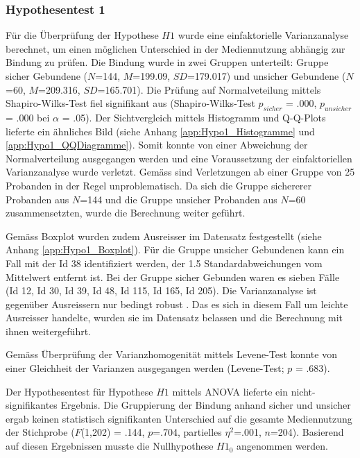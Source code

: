 \subsubsection{Hypothesentest 1}\label{sec:Hypothesentest1}
Für die Überprüfung der Hypothese $H1$ wurde eine einfaktorielle Varianzanalyse berechnet, um einen möglichen Unterschied in der Mediennutzung abhängig zur Bindung zu prüfen. Die Bindung wurde in zwei Gruppen unterteilt: Gruppe sicher Gebundene ($N$=144, $M$=199.09, $SD$=179.017) und unsicher Gebundene ($N$=60, $M$=209.316, $SD$=165.701). Die Prüfung auf Normalveteilung mittels Shapiro-Wilks-Test \cite{Shapiro1965} fiel signifikant aus (Shapiro-Wilks-Test $p_{sicher}$ = .000, $p_{unsicher}$ = .000 bei $\alpha$ = .05). Der Sichtvergleich mittels Histogramm und Q-Q-Plots lieferte ein ähnliches Bild (siehe Anhang \ref{app:Hypo1_Histogramme} und \ref{app:Hypo1_QQDiagramme}). Somit konnte von einer Abweichung der Normalverteilung ausgegangen werden \cite{Hemmerich2018} und eine Voraussetzung der einfaktoriellen Varianzanalyse wurde verletzt. Gemäss  sind Verletzungen ab einer Gruppe von 25 Probanden in der Regel unproblematisch. Da sich die Gruppe sichererer Probanden aus $N$=144 und die Gruppe unsicher Probanden aus $N$=60 zusammensetzten, wurde die Berechnung weiter geführt.

Gemäss Boxplot wurden zudem Ausreisser im Datensatz festgestellt (siehe Anhang \ref{app:Hypo1_Boxplot}). Für die Gruppe unsicher Gebundenen kann ein Fall mit der Id 38 identifiziert werden, der 1.5 Standardabweichungen vom Mittelwert entfernt ist. Bei der Gruppe sicher Gebunden waren es sieben Fälle (Id 12, Id 30, Id 39, Id 48, Id 115, Id 165, Id 205). Die Varianzanalyse ist gegenüber Ausreissern nur bedingt robust \cite{Hemmerich2018}. Das es sich in diesem Fall um leichte Ausreisser handelte, wurden sie im Datensatz belassen und die Berechnung mit ihnen weitergeführt.  

Gemäss Überprüfung der Varianzhomogenität mittels Levene-Test konnte von einer Gleichheit der Varianzen ausgegangen werden (Levene-Test; $p$ = .683). 

Der Hypothesentest für Hypothese $H1$ mittels ANOVA lieferte ein nicht-signifikantes Ergebnis. Die Gruppierung der Bindung anhand sicher und unsicher ergab keinen statistisch signifikanten Unterschied auf die gesamte Mediennutzung der Stichprobe ($F$(1,202) = .144, $p$=.704, partielles $\eta^2$=.001, $n$=204). Basierend auf diesen Ergebnissen musste die Nullhypothese $H1_{0}$ angenommen werden. 

